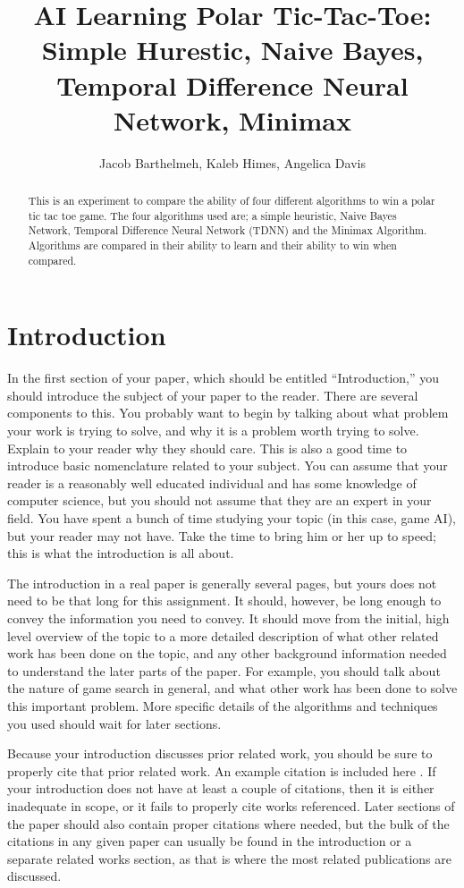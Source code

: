 \documentclass[12pt,letterpaper]{article}
\title{AI Learning Polar Tic-Tac-Toe: \\ Simple Hurestic, Naive Bayes, Temporal Difference Neural Network, Minimax}
\author{Jacob Barthelmeh, Kaleb Himes, Angelica Davis}
\begin{document}
\maketitle

\begin{abstract}
This is an experiment to compare the ability of four different algorithms to win a polar tic tac toe game. The four algorithms used are; a simple heuristic, Naive Bayes Network, Temporal Difference Neural Network (TDNN) and the Minimax Algorithm. Algorithms are compared in their ability to learn and their ability to win when compared.
\end{abstract}

\section{Introduction}
In the first section of your paper, which should be entitled ``Introduction,''
you should introduce the subject of your paper to the reader.  There are several
components to this.  You probably want to begin by talking about what problem
your work is trying to solve, and why it is a problem worth trying to solve.
Explain to your reader why they should care.  This is also a good time to
introduce basic nomenclature related to your subject.  You can assume that your
reader is a reasonably well educated individual and has some knowledge of
computer science, but you should not assume that they are an expert in your field.  You have
spent a bunch of time studying your topic (in this case, game AI), but
your reader may not have.  Take the time to bring him or her up to speed; this
is what the introduction is all about.

The introduction in a real paper is generally several pages, but yours does not
need to be that long for this assignment.  It should, however, be long enough to
convey the information you need to convey.  It should move from the initial, high level
overview of the topic to a more detailed description of what other related work
has been done on the topic, and any other background information needed to
understand the later parts of the paper.  For example, you should talk about the nature
of game search in general, and what other work has been
done to solve this important problem.  More specific details of the algorithms and
techniques you used should wait for later sections.

Because your introduction discusses prior related work, you should be sure to
properly cite that prior related work. An example citation is included here \cite{tesauro1995temporal}.
If your introduction does not have at
least a couple of citations, then it is either inadequate in scope, or it fails
to properly cite works referenced.  Later sections of the
paper should also contain proper citations where needed, but the bulk of the
citations in any given paper can usually be found in the introduction or a 
separate related works section, as that
is where the most related publications are discussed.
\end{document}
